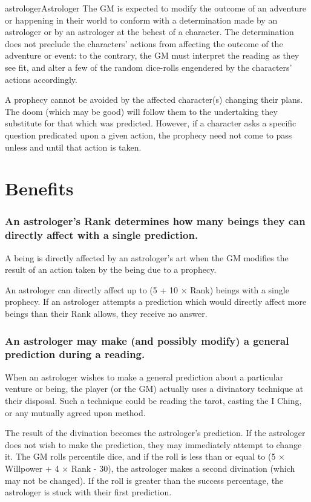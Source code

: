 \begin{Skill}{astrologer}{Astrologer}
The GM is expected to modify the outcome of an adventure or happening
in their world to conform with a determination made by an astrologer
or by an astrologer at the behest of a character.  The determination
does not preclude the characters’ actions from affecting the outcome
of the adventure or event: to the contrary, the GM must interpret the
reading as they see fit, and alter a few of the random dice-rolls
engendered by the characters’ actions accordingly.

A prophecy cannot be avoided by the affected character(s) changing
their plans.  The doom (which may be good) will follow them to the
undertaking they substitute for that which was predicted.  However,
if a character asks a specific question predicated upon a given
action, the prophecy need not come to pass unless and until that
action is taken.

\section{Benefits}

\subsubsection{An astrologer’s Rank determines how many beings they can directly
affect with a single prediction.}

A being is directly affected by an astrologer’s art when the GM
modifies the result of an action taken by the being due to a prophecy.

An astrologer can directly affect up to (5 + 10 × Rank) beings with a
single prophecy. If an astrologer attempts a prediction which would
directly affect more beings than their Rank allows, they receive no
answer.

\subsubsection{An astrologer may make (and possibly modify) a general prediction
during a reading.}

When an astrologer wishes to make a general prediction about a
particular venture or being, the player (or the GM) actually uses a
divinatory technique at their disposal.  Such a technique could be
reading the tarot, casting the I Ching, or any mutually agreed upon
method.

The result of the divination becomes the astrologer’s prediction.  If
the astrologer does not wish to make the prediction, they may
immediately attempt to change it.  The GM rolls percentile dice, and
if the roll is less than or equal to (5 × Willpower + 4 × Rank - 30),
the astrologer makes a second divination (which may not be changed).
If the roll is greater than the success percentage, the astrologer is
stuck with their first prediction.


\end{Skill}
